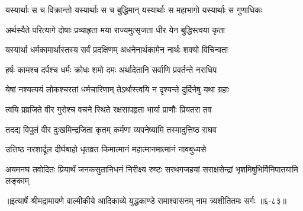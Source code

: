 \twolineshloka
{यस्यार्थाः स च विक्रान्तो यस्यार्थाः स च बुद्धिमान्}
{यस्यार्थाः स महाभागो यस्यार्थाः स गुणाधिकः} %

\twolineshloka
{अर्थस्यैते परित्यागे दोषाः प्रव्याहृता मया}
{राज्यमुत्सृजता धीर येन बुद्धिस्त्वया कृता} %

\twolineshloka
{यस्यार्था धर्मकामार्थास्तस्य सर्वं प्रदक्षिणम्}
{अधनेनार्थकामेन नार्थः शक्यो विचिन्वता} %

\twolineshloka
{हर्षः कामश्च दर्पश्च धर्मः क्रोधः शमो दमः}
{अर्थादेतानि सर्वाणि प्रवर्तन्ते नराधिप} %

\twolineshloka
{येषां नश्यत्ययं लोकश्चरतां धर्मचारिणाम्}
{तेऽर्थास्त्वयि न दृश्यन्ते दुर्दिनेषु यथा ग्रहाः} %

\twolineshloka
{त्वयि प्रव्रजिते वीर गुरोश्च वचने स्थिते}
{रक्षसापहृता भार्या प्राणौः प्रियतरा तव} %

\twolineshloka
{तदद्य विपुलं वीर दुःखमिन्द्रजिता कृतम्}
{कर्मणा व्यपनेष्यामि तस्मादुत्तिष्ठ राघव} %

\twolineshloka
{उत्तिष्ठ नरशार्दूल दीर्घबाहो धृतव्रत}
{किमात्मानं महात्मानमात्मानं नावबुध्यसे} %

\twolineshloka
{अयमनघ तवोदितः प्रियार्थं जनकसुतानिधनं निरीक्ष्य रुष्टः}
{सरथगजहयां सराक्षसेन्द्रां भृशमिषुभिर्विनिपातयामि लङ्काम्} %


॥इत्यार्षे श्रीमद्रामायणे वाल्मीकीये आदिकाव्ये युद्धकाण्डे रामाश्वासनम् नाम त्र्यशीतितमः सर्गः ॥६-८३॥
